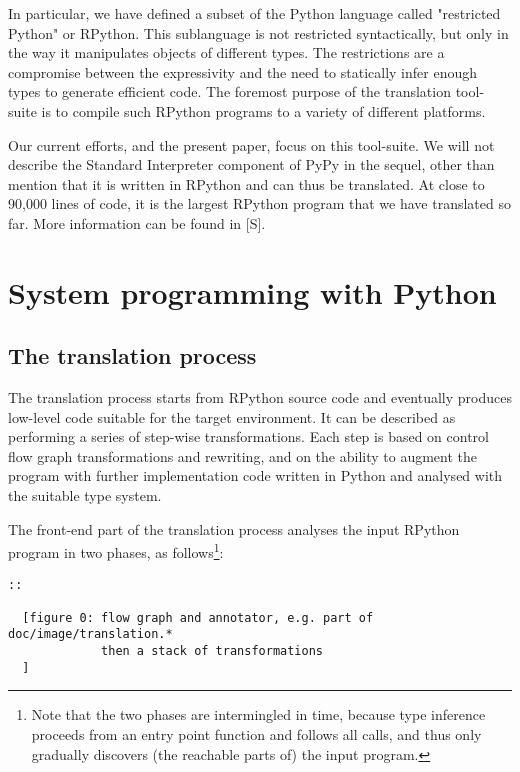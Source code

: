 \documentclass{acm_proc_article-sp}
\begin{document}
In particular, we have defined a subset of the Python language called
"restricted Python" or RPython.  This sublanguage is not restricted
syntactically, but only in the way it manipulates objects of different
types.  The restrictions are a compromise between the expressivity and
the need to statically infer enough types to generate efficient code.
The foremost purpose of the translation tool-suite is to compile such
RPython programs to a variety of different platforms.

Our current efforts, and the present paper, focus on this tool-suite.
We will not describe the Standard Interpreter component of PyPy in the
sequel, other than mention that it is written in RPython and can thus be
translated.  At close to 90,000 lines of code, it is the largest RPython
program that we have translated so far.  More information can be found
in [S].


\section{System programming with Python}
\label{systemprog}

\hypertarget{the-translation-process}{}
\subsection{The translation process}
\label{translationprocess}

The translation process starts from RPython source code and eventually
produces low-level code suitable for the target environment.  It can be
described as performing a series of step-wise transformations.  Each
step is based on control flow graph transformations and rewriting, and
on the ability to augment the program with further implementation code
written in Python and analysed with the suitable type system.

The front-end part of the translation process analyses the input
RPython program in two phases, as follows\footnote{Note that the two
phases are intermingled in time, because type inference proceeds from
an entry point function and follows all calls, and thus only gradually
discovers (the reachable parts of) the input program.}:

\begin{verbatim}
::

  [figure 0: flow graph and annotator, e.g. part of doc/image/translation.*
             then a stack of transformations
  ]
\end{verbatim}
\end{document}
